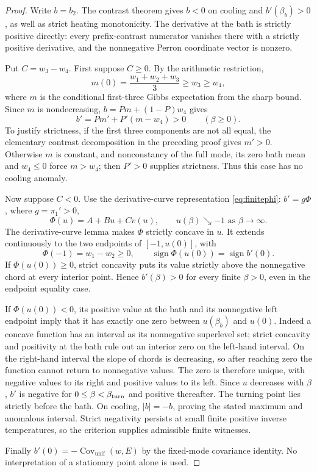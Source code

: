 \begin{proof}
Write $b=b_2$. The contrast theorem gives $b<0$ on cooling and
$b'(\beta_b)>0$, as well as strict heating monotonicity. The derivative
at the bath is strictly positive directly: every prefix-contrast numerator
vanishes there with a strictly positive derivative, and the nonnegative
Perron coordinate vector is nonzero.

Put $C=w_3-w_4$. First suppose $C\geq0$. By the arithmetic restriction,
\[
m(0)=\frac{w_1+w_2+w_3}{3}\geq w_3\geq w_4,
\]
where $m$ is the conditional first-three Gibbs expectation from the sharp
bound. Since $m$ is nondecreasing, $b=Pm+(1-P)w_4$ gives
\[
b'=Pm'+P'(m-w_4)>0 \qquad (\beta\geq0).
\]
To justify strictness, if the first three components are not all equal,
the elementary contrast decomposition in the preceding proof gives
$m'>0$. Otherwise $m$ is constant, and nonconstancy of the full mode,
its zero bath mean and $w_4\leq0$ force $m>w_4$; then $P'>0$ supplies
strictness. Thus this case has no cooling anomaly.

Now suppose $C<0$. Use the derivative-curve representation
\eqref{eq:finitephi}: $b'=g\Phi$, where $g=\pi_1'>0$,
\[
\Phi(u)=A+Bu+C v(u),\qquad
u(\beta)\searrow-1 \text{ as }\beta\to\infty.
\]
The derivative-curve lemma makes $\Phi$ strictly concave in $u$.
It extends continuously to the two endpoints of
$[-1,u(0)]$, with
\[
\Phi(-1)=w_1-w_2\geq0,
\qquad \operatorname{sign}\Phi(u(0))=\operatorname{sign}b'(0).
\]
If $\Phi(u(0))\geq0$, strict concavity puts its value strictly above the
nonnegative chord at every interior point. Hence $b'(\beta)>0$ for every
finite $\beta>0$, even in the endpoint equality case.

If $\Phi(u(0))<0$, its positive value at the bath and its nonnegative
left endpoint imply that it has exactly one zero between $u(\beta_b)$
and $u(0)$. Indeed a concave function has an interval as its nonnegative
superlevel set; strict concavity and positivity at the bath rule out an
interior zero on the left-hand interval. On the right-hand interval the
slope of chords is decreasing, so after reaching zero the function cannot
return to nonnegative values. The zero is therefore unique, with negative
values to its right and positive values to its left. Since $u$ decreases
with $\beta$, $b'$ is negative for $0\leq\beta<\beta_{\rm turn}$ and
positive thereafter. The turning point lies strictly before the bath.
On cooling, $|b|=-b$, proving the stated maximum and anomalous interval.
Strict negativity persists at small finite positive inverse temperatures,
so the criterion supplies admissible finite witnesses.

Finally $b'(0)=-\operatorname{Cov}_{\mathrm{unif}}(w,E)$ by the fixed-mode
covariance identity. No interpretation of a stationary point alone is used.
\end{proof}

